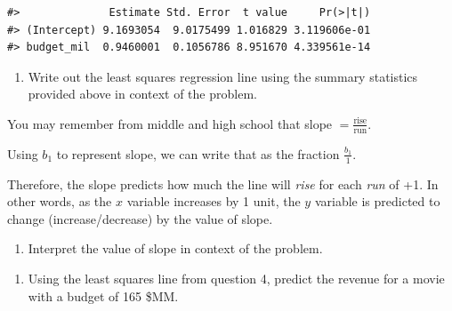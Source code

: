 \documentclass[
]{report}
\newenvironment{Shaded}{\begin{snugshade}}{\end{snugshade}}
\newcommand{\AttributeTok}[1]{\textcolor[rgb]{0.77,0.63,0.00}{#1}}
\newcommand{\CommentTok}[1]{\textcolor[rgb]{0.56,0.35,0.01}{\textit{#1}}}
\newcommand{\FunctionTok}[1]{\textcolor[rgb]{0.00,0.00,0.00}{#1}}
\newcommand{\NormalTok}[1]{#1}
\newcommand{\OtherTok}[1]{\textcolor[rgb]{0.56,0.35,0.01}{#1}}
\newcommand{\SpecialCharTok}[1]{\textcolor[rgb]{0.00,0.00,0.00}{#1}}
\providecommand{\tightlist}{%
  \setlength{\itemsep}{0pt}\setlength{\parskip}{0pt}}
\begin{document}
\begin{Shaded}
\end{Shaded}

\begin{verbatim}
#>              Estimate Std. Error  t value     Pr(>|t|)
#> (Intercept) 9.1693054  9.0175499 1.016829 3.119606e-01
#> budget_mil  0.9460001  0.1056786 8.951670 4.339561e-14
\end{verbatim}

\begin{enumerate}
\def\labelenumi{\arabic{enumi}.}
\setcounter{enumi}{3}
\tightlist
\item
  Write out the least squares regression line using the summary statistics provided above in context of the problem.
  \vspace{0.8in}
\end{enumerate}

You may remember from middle and high school that slope \(=\frac{\mbox{rise}}{\mbox{run}}\).

Using \(b_1\) to represent slope, we can write that as the fraction \(\frac{b_1}{1}\).

Therefore, the slope predicts how much the line will \emph{rise} for each \emph{run} of +1. In other words, as the \(x\) variable increases by 1 unit, the \(y\) variable is predicted to change (increase/decrease) by the value of slope.

\begin{enumerate}
\def\labelenumi{\arabic{enumi}.}
\setcounter{enumi}{4}
\tightlist
\item
  Interpret the value of slope in context of the problem.
\end{enumerate}

\vspace{.8in}

\begin{enumerate}
\def\labelenumi{\arabic{enumi}.}
\setcounter{enumi}{5}
\tightlist
\item
  Using the least squares line from question 4, predict the revenue for a movie with a budget of 165 \$MM.
\end{enumerate}
\end{document}
